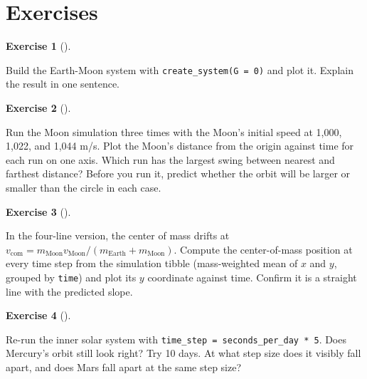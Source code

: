 \documentclass[
  10.5pt,
  letterpaper,
]{scrbook}
\theoremstyle{definition}
\newtheorem{exercise}{Exercise}[chapter]
\theoremstyle{plain}
\theoremstyle{remark}
\begin{document}
\section*{Exercises}\label{exercises-1}


\begin{exercise}[]\protect\hypertarget{exr-ch2-zero-g}{}\label{exr-ch2-zero-g}

Build the Earth-Moon system with \texttt{create\_system(G\ =\ 0)} and
plot it. Explain the result in one sentence.

\end{exercise}

\begin{exercise}[]\protect\hypertarget{exr-ch2-speed}{}\label{exr-ch2-speed}

Run the Moon simulation three times with the Moon's initial speed at
1,000, 1,022, and 1,044 m/s. Plot the Moon's distance from the origin
against time for each run on one axis. Which run has the largest swing
between nearest and farthest distance? Before you run it, predict
whether the orbit will be larger or smaller than the circle in each
case.

\end{exercise}

\begin{exercise}[]\protect\hypertarget{exr-ch2-com}{}\label{exr-ch2-com}

In the four-line version, the center of mass drifts at
\(v_{\mathrm{com}} = m_{\mathrm{Moon}} v_{\mathrm{Moon}} / (m_{\mathrm{Earth}} + m_{\mathrm{Moon}})\).
Compute the center-of-mass position at every time step from the
simulation tibble (mass-weighted mean of \(x\) and \(y\), grouped by
\texttt{time}) and plot its \(y\) coordinate against time. Confirm it is
a straight line with the predicted slope.

\end{exercise}

\begin{exercise}[]\protect\hypertarget{exr-ch2-step}{}\label{exr-ch2-step}

Re-run the inner solar system with
\texttt{time\_step\ =\ seconds\_per\_day\ *\ 5}. Does Mercury's orbit
still look right? Try 10 days. At what step size does it visibly fall
apart, and does Mars fall apart at the same step size?

\end{exercise}
\end{document}
